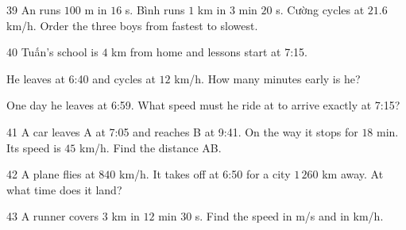 \gap
\begin{probbox}{39}{}
An runs $100$ m in $16$ s. Bình runs $1$ km in $3$ min $20$ s. Cường cycles at $21.6$ km/h. Order the three boys from fastest to slowest.
\end{probbox}
\gap
\begin{probbox}{40}{}
Tuấn's school is $4$ km from home and lessons start at 7:15.\par
{} He leaves at 6:40 and cycles at $12$ km/h. How many minutes early is he?\par
{} One day he leaves at 6:59. What speed must he ride at to arrive exactly at 7:15?
\end{probbox}
\gap
\begin{probbox}{41}{}
A car leaves A at 7:05 and reaches B at 9:41. On the way it stops for $18$ min. Its speed is $45$ km/h. Find the distance AB.
\end{probbox}
\gap
\begin{probbox}{42}{}
A plane flies at $840$ km/h. It takes off at 6:50 for a city $1\,260$ km away. At what time does it land?
\end{probbox}
\gap
\begin{probbox}{43}{}
A runner covers $3$ km in $12$ min $30$ s. Find the speed in m/s and in km/h.
\end{probbox}
